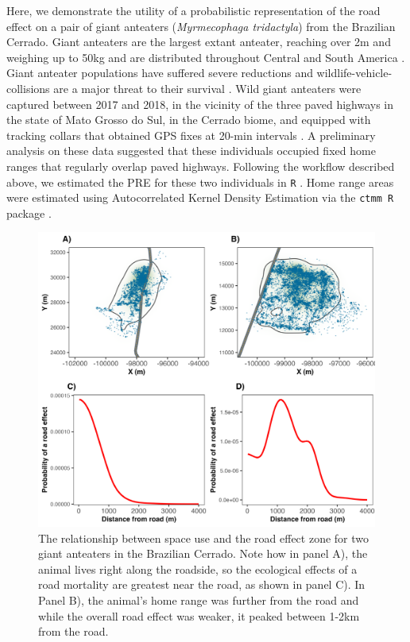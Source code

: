 \documentclass[11pt]{article}
\begin{document}
Here, we demonstrate the utility of a probabilistic representation of the road effect on a pair of giant anteaters (\textit{Myrmecophaga tridactyla}) from the Brazilian Cerrado. Giant anteaters are the largest extant anteater, reaching over 2m and weighing up to 50kg \citep{McNab:1984} and are distributed throughout Central and South America \citep{Gardner:2008}. Giant anteater populations have suffered severe reductions and wildlife-vehicle-collisions are a major threat to their survival \citep{Ascensao:2021, Noonan:2022b}. Wild giant anteaters were captured between 2017 and 2018, in the vicinity of the three paved highways in the state of Mato Grosso do Sul, in the Cerrado biome, and equipped with tracking collars that obtained GPS fixes at 20-min intervals \citep[for full details see][]{Noonan:2022b}. A preliminary analysis on these data suggested that these individuals occupied fixed home ranges that regularly overlap paved highways. Following the workflow described above, we estimated the PRE for these two individuals in \texttt{R} \citep[ver. 4.2.1,][]{RAlanguageanden:2016wf}. Home range areas were estimated using Autocorrelated Kernel Density Estimation \citep[AKDE,][]{Fleming:2015tw} via the \texttt{ctmm R} package \citep[ver. 1.1.0,][]{Calabrese:2016ey}. 

\begin{figure}[h!]
\centering
\includegraphics[scale= 0.9]{Anteater_RE}
\caption{The relationship between space use and the road effect zone for two giant anteaters in the Brazilian Cerrado. Note how in panel A), the animal lives right along the roadside, so the ecological effects of a road mortality are greatest near the road, as shown in panel C). In Panel B), the animal's home range was further from the road and while the overall road effect was weaker, it peaked between 1-2km from the road.}
\label{Fig:anteaters}
\end{figure}
\end{document}
